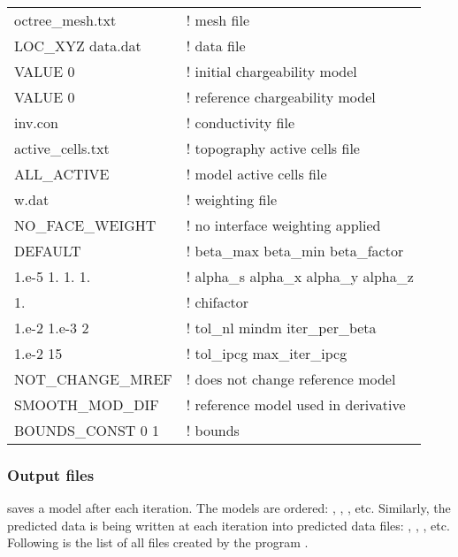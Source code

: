 \begin{adjustwidth}{-1in}{-1in}
\begin{fileExample}
\begin{tabular}{|ll|}
\hline
octree\_mesh.txt & ! mesh file \\
LOC\_XYZ  data.dat & ! data file \\
VALUE  0 & ! initial chargeability model \\
VALUE  0 & ! reference chargeability model \\
inv.con & ! conductivity file \\
active\_cells.txt & ! topography active cells file \\
ALL\_ACTIVE & ! model active cells file \\
w.dat & ! weighting file \\
NO\_FACE\_WEIGHT  & ! no interface weighting applied \\
DEFAULT & ! beta\_max  beta\_min  beta\_factor \\
1.e-5  1.  1.  1. & ! alpha\_s  alpha\_x  alpha\_y  alpha\_z \\
1. & ! chifactor\\
1.e-2  1.e-3  2 & ! tol\_nl  mindm  iter\_per\_beta \\
1.e-2  15 & ! tol\_ipcg  max\_iter\_ipcg \\
NOT\_CHANGE\_MREF & ! does not change reference model \\
SMOOTH\_MOD\_DIF & ! reference model used in derivative \\
BOUNDS\_CONST  0  1 & ! bounds \\
\hline
\end{tabular}
\end{fileExample}
\end{adjustwidth} 

\subsubsection{Output files}

 saves a model after each iteration. The models are ordered: , , , etc. Similarly, the predicted data is being written at each iteration into predicted data files: , , , etc.
Following is the list of all files created by the program .

